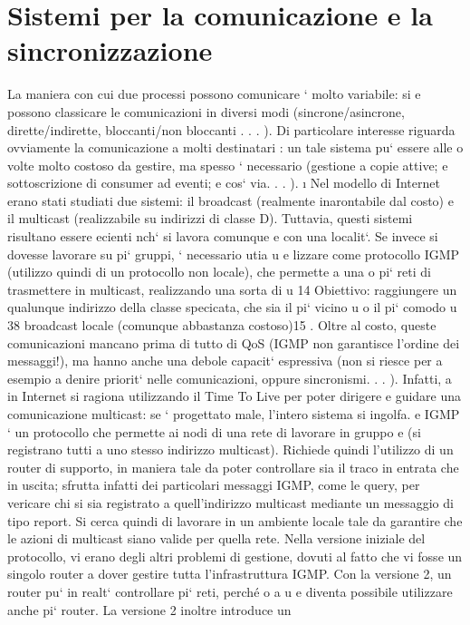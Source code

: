 \documentclass[a4paper,12pt]{article}
\begin{document}
\section{Sistemi per la comunicazione e la sincronizzazione}
La maniera con cui due processi possono comunicare ` molto variabile: si
e
possono classicare le comunicazioni in diversi modi (sincrone/asincrone, dirette/indirette, bloccanti/non bloccanti . .
. ). Di particolare interesse riguarda
ovviamente la comunicazione a molti destinatari : un tale sistema pu` essere alle
o
volte molto costoso da gestire, ma spesso ` necessario (gestione a copie attive;
e
sottoscrizione di consumer ad eventi; e cos` via. . . ).
\i{}
Nel modello di Internet erano stati studiati due sistemi: il broadcast (realmente inarontabile dal costo) e il multicast
(realizzabile su indirizzi di classe
D). Tuttavia, questi sistemi risultano essere ecienti nch` si lavora comunque
e
con una localit`. Se invece si dovesse lavorare su pi` gruppi, ` necessario utia
u
e
lizzare come protocollo IGMP (utilizzo quindi di un protocollo non locale), che
permette a una o pi` reti di trasmettere in multicast, realizzando una sorta di
u
14 Obiettivo: raggiungere un qualunque indirizzo della classe specicata, che sia il pi` vicino
u
o il pi` comodo
u
38
broadcast locale (comunque abbastanza costoso)15 . Oltre al costo, queste comunicazioni mancano prima di tutto di QoS
(IGMP non garantisce l'ordine dei
messaggi!), ma hanno anche una debole capacit` espressiva (non si riesce per
a
esempio a denire priorit` nelle comunicazioni, oppure sincronismi. . . ). Infatti,
a
in Internet si ragiona utilizzando il Time To Live per poter dirigere e guidare
una comunicazione multicast: se ` progettato male, l'intero sistema si ingolfa.
e
IGMP ` un protocollo che permette ai nodi di una rete di lavorare in gruppo
e
(si registrano tutti a uno stesso indirizzo multicast). Richiede quindi l'utilizzo
di un router di supporto, in maniera tale da poter controllare sia il traco in
entrata che in uscita; sfrutta infatti dei particolari messaggi IGMP, come le
query, per vericare chi si sia registrato a quell'indirizzo multicast mediante un
messaggio di tipo report. Si cerca quindi di lavorare in un ambiente locale tale
da garantire che le azioni di multicast siano valide per quella rete.
Nella versione iniziale del protocollo, vi erano degli altri problemi di gestione,
dovuti al fatto che vi fosse un singolo router a dover gestire tutta l'infrastruttura
IGMP. Con la versione 2, un router pu` in realt` controllare pi` reti, perché
o
a
u
e
diventa possibile utilizzare anche pi` router. La versione 2 inoltre introduce un
\end{document}

